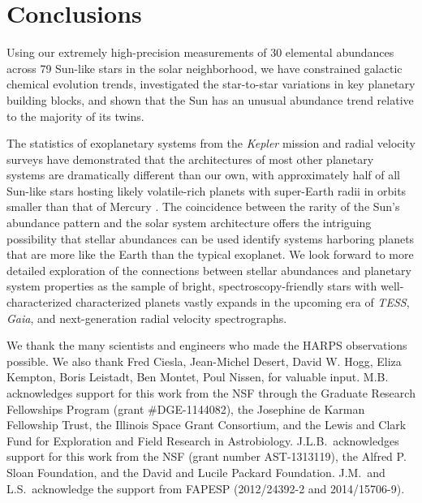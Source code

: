 \documentclass[twocolumn]{aastex62}
\newcommand{\acronym}[1]{{\small{#1}}}
\begin{document}
\section{Conclusions}

Using our extremely high-precision measurements of 30 elemental abundances across 79 Sun-like stars in the solar neighborhood, we have constrained galactic chemical evolution trends, investigated the star-to-star variations in key planetary building blocks, and shown that the Sun has an unusual abundance trend relative to the majority of its twins.

The statistics of exoplanetary systems from the \textit{Kepler} mission and radial velocity surveys have demonstrated that the architectures of most other planetary systems are dramatically different than our own, with approximately half of all Sun-like stars hosting likely volatile-rich planets with super-Earth radii in orbits smaller than that of Mercury \citep{winn15, rogers15}. 
The coincidence between the rarity of the Sun's abundance pattern and the solar system architecture offers the intriguing possibility that stellar abundances can be used identify systems harboring planets that are more like the Earth than the typical exoplanet. 
We look forward to more detailed exploration of the connections between stellar abundances and planetary system properties as the sample of bright, spectroscopy-friendly stars with well-characterized characterized planets vastly expands in the upcoming era of \textit{\acronym{TESS}}, \textit{Gaia}, and next-generation radial velocity spectrographs.


\acknowledgements
We thank the many scientists and engineers who made the \acronym{HARPS} observations possible. We also thank Fred Ciesla, Jean-Michel Desert,  David W. Hogg, Eliza Kempton, Boris Leistadt, Ben Montet,  Poul Nissen,  for valuable input.  M.B. acknowledges support for this work from the \acronym{NSF} through the Graduate Research Fellowships Program (grant \#DGE-1144082), the Josephine de Karman Fellowship Trust, the Illinois Space Grant Consortium, and the Lewis and Clark Fund for Exploration and Field Research in Astrobiology. J.L.B.\ acknowledges support for this work from the NSF (grant number AST-1313119), the Alfred P. Sloan Foundation, and the David and Lucile Packard Foundation. J.M.\ and L.S.\ acknowledge the support from \acronym{FAPESP} (2012/24392-2 and 2014/15706-9).
\end{document}
